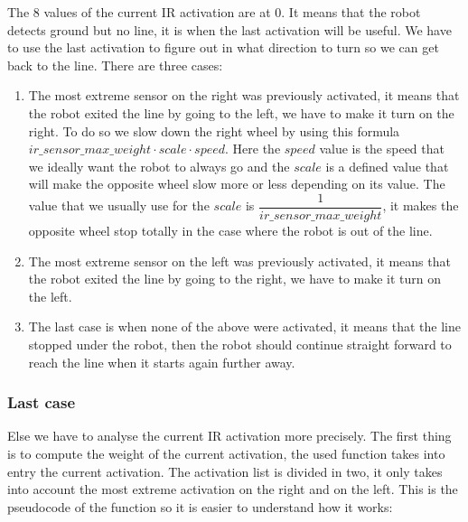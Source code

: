 The 8 values of the current IR activation are at 0.
It means that the robot detects ground but no line, it is when the last activation will be useful.
We have to use the last activation to figure out in what direction to turn so we can get back to the line.
There are three cases:
\begin{enumerate}
    \item The most extreme sensor on the right was previously activated, it means that the robot exited the line by going to the left, we have to make it turn on the right.
        To do so we slow down the right wheel by using this formula $ir\_sensor\_max\_weight \cdot scale \cdot speed$.
        Here the $speed$ value is the speed that we ideally want the robot to always go and the $scale$ is a defined value that will make the opposite wheel slow more or less depending on its value.
        The value that we usually use for the $scale$ is $\dfrac{1}{ir\_sensor\_max\_weight}$, it makes the opposite wheel stop totally in the case where the robot is out of the line.
    \item The most extreme sensor on the left was previously activated, it means that the robot exited the line by going to the right, we have to make it turn on the left.
    \item The last case is when none of the above were activated, it means that the line stopped under the robot, then the robot should continue straight forward to reach the line when it starts again further away.
\end{enumerate}

\subsubsection*{Last case}

Else we have to analyse the current IR activation more precisely.
The first thing is to compute the weight of the current activation, the used function takes into entry the current activation.
The activation list is divided in two, it only takes into account the most extreme activation on the right and on the left.
This is the pseudocode of the function so it is easier to understand how it works:

